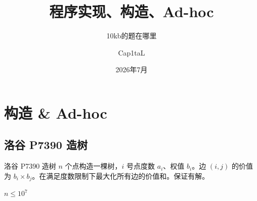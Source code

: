 ﻿\documentclass[aspectratio=169]{ctexbeamer}
\author{Cap1taL}
\title{程序实现、构造、Ad-hoc}
\subtitle{10kb的题在哪里}
\date{2026年7月}
\begin{document}
\kaishu

\begin{frame}
    \titlepage
\end{frame}



\section{构造 \& Ad-hoc}

    







\subsection{洛谷 P7390 造树}
\begin{frame}{洛谷 P7390 造树}
    $n$ 个点构造一棵树，$i$ 号点度数 $a_i$、权值 $b_i$。边 $(i,j)$ 的价值为 $b_i\times b_j$。在满足度数限制下最大化所有边的价值和。保证有解。
    
    $n\le 10^7$
\end{frame}
\end{document}
